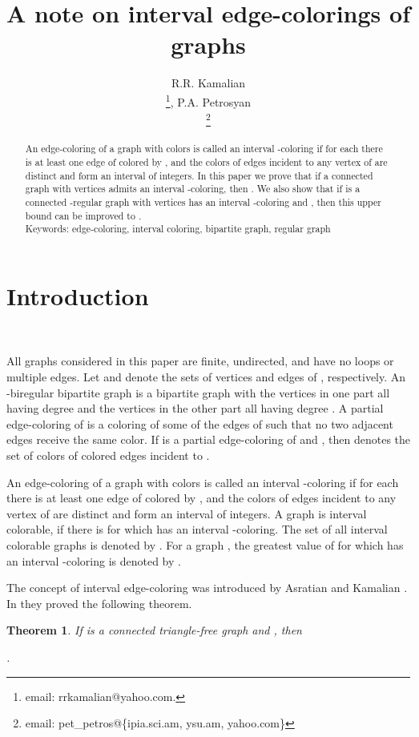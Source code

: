 \documentclass[fleqn,12pt,twoside]{article}
\title{A note on interval edge-colorings of graphs}
\author{R.R. Kamalian\address[MCSD]{Institute for Informatics and Automation Problems,\\
National Academy of Sciences, 0014, Armenia}\address{Department of Applied Mathematics and Informatics,\\
Russian-Armenian State University, 0051, Armenia}\thanks{email: rrkamalian@yahoo.com.},
        P.A. Petrosyan\addressmark[MCSD]\address{Department of Informatics and Applied Mathematics,\\
Yerevan State University, 0025, Armenia}\thanks {email: pet\_petros@\{ipia.sci.am, ysu.am, yahoo.com\}}}
\newtheorem{theorem}{Theorem}
\begin{document}
\maketitle

\begin{abstract}
An edge-coloring of a graph  with colors  is
called an interval -coloring if for each 
there is at least one edge of  colored by , and the colors of
edges incident to any vertex of  are distinct and form an
interval of integers. In this paper we prove that if a connected
graph  with  vertices admits an interval -coloring, then
. We also show that if  is a connected -regular
graph with  vertices has an interval -coloring and , then this upper bound can be improved to .\\

Keywords: edge-coloring, interval coloring, bipartite graph, regular
graph

\end{abstract}

\bigskip

\section{Introduction}\

All graphs considered in this paper are finite, undirected, and have
no loops or multiple edges. Let  and  denote the sets of
vertices and edges of , respectively. An -biregular
bipartite graph  is a bipartite graph  with the vertices in
one part all having degree  and the vertices in the other part
all having degree . A partial edge-coloring of  is a coloring
of some of the edges of  such that no two adjacent edges receive
the same color. If  is a partial edge-coloring of  and
, then  denotes the set of
colors of colored edges incident to .

An edge-coloring of a graph  with colors  is
called an interval -coloring if for each 
there is at least one edge of  colored by , and the colors of
edges incident to any vertex of  are distinct and form an
interval of integers. A graph  is interval colorable, if there is
 for which  has an interval -coloring. The set of all
interval colorable graphs is denoted by . For a graph
, the greatest value of  for which  has an
interval -coloring is denoted by .

The concept of interval edge-coloring was introduced by Asratian and
Kamalian \cite{b2}. In \cite{b2,b3} they proved the following
theorem.

\begin{theorem}
\label{mytheorem1} If  is a connected triangle-free graph and
, then
\begin{center}
.
\end{center}
\end{theorem}
\end{document}
